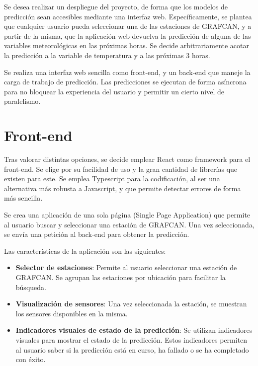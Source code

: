 
Se desea realizar un despliegue del proyecto, de forma que los modelos de predicción sean accesibles mediante una interfaz web. Específicamente, se plantea que cualquier usuario 
pueda seleccionar una de las estaciones de GRAFCAN, y a partir de la misma, que la aplicación web devuelva la predicción de alguna de las variables meteorológicas en las próximas horas. 
Se decide arbitrariamente acotar la predicción a la variable de temperatura y a las próximas 3 horas.

Se realiza una interfaz web sencilla como front-end, y un back-end que maneje la carga de trabajo de predicción. Las predicciones se ejecutan de forma asíncrona 
para no bloquear la experiencia del usuario y permitir un cierto nivel de paralelismo.

\section{Front-end}
Tras valorar distintas opciones, se decide emplear React como framework para el front-end. Se elige por su facilidad de uso y la gran cantidad de librerías que existen para este.
Se emplea Typescript para la codificación, al ser una alternativa más robusta a Javascript, y que permite detectar errores de forma más sencilla.

Se crea una aplicación de una sola página (Single Page Application) que permite al usuario buscar y seleccionar una estación de GRAFCAN. Una vez seleccionada,
se envía una petición al back-end para obtener la predicción.

Las características de la aplicación son las siguientes:
\begin{itemize}
    \item \textbf{Selector de estaciones}: Permite al usuario seleccionar una estación de GRAFCAN. Se agrupan las estaciones por ubicación para facilitar la búsqueda.
    \item \textbf{Visualización de sensores}: Una vez seleccionada la estación, se muestran los sensores disponibles en la misma. 
    \item \textbf{Indicadores visuales de estado de la predicción}: Se utilizan indicadores visuales para mostrar el estado de la predicción. Estos indicadores permiten al usuario saber si la predicción está en curso, ha fallado o se ha completado con éxito.
\end{itemize}


